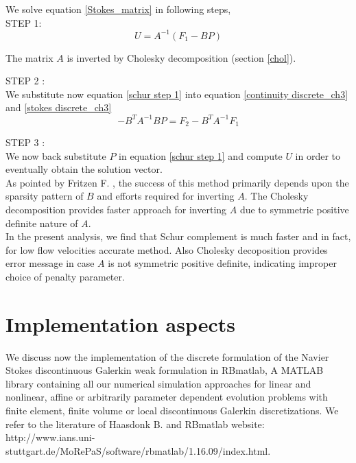 \documentclass[a4paper]{book}
\begin{document}
We solve equation \eqref{Stokes_matrix} in following steps,\\

STEP 1: \\ 
\begin{equation}\label{schur step 1}
U = A^{-1}(F_1 - BP) 
\end{equation}

The matrix $A$ is inverted by Cholesky decomposition (section \ref{chol}). 

STEP 2 : \\
We substitute now equation \eqref{schur step 1} into equation \eqref{continuity discrete_ch3} and \eqref{stokes discrete_ch3}
\begin{equation}\label{schur step 2}
- B^T A^{-1} B P = F_2 - B^T A^{-1} F_1
\end{equation}

STEP 3 : \\
We now back substitute $P$ in equation \eqref{schur step 1} and compute $U$ in order to eventually obtain the solution vector.
\\

As pointed by Fritzen F. \cite{Fritzen}, the success of this method primarily depends upon the sparsity pattern of $B$ and efforts required for inverting $A$. The Cholesky decomposition provides faster approach for inverting $A$ due to symmetric positive definite nature of $A$. \\

In the present analysis, we find that Schur complement is much faster and in fact, for low flow velocities accurate method. Also Cholesky decoposition provides error message in case $A$ is not symmetric positive definite, indicating improper choice of penalty parameter. 

\chapter{Implementation aspects} \label{implementation_aspects}

We discuss now the implementation of the discrete formulation of the Navier Stokes discontinuous Galerkin weak formulation in RBmatlab, A MATLAB library containing all our numerical simulation approaches for linear and nonlinear, affine or arbitrarily parameter dependent evolution problems with finite element, finite volume or local discontinuous Galerkin discretizations. We refer to the literature of Haasdonk B.\cite{Haasdonk_book} and RBmatlab website: \linebreak http://www.ians.uni-stuttgart.de/MoRePaS/software/rbmatlab/1.16.09/\linebreak index.html.  
\end{document}
